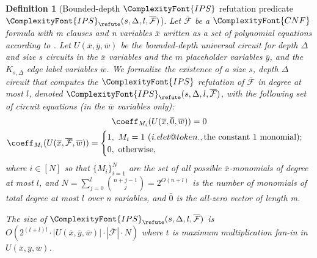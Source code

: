 \documentclass[11pt,letter]{article}
\makeatletter
\newtheorem{definition}[theorem]{Definition}
\theoremstyle{remark} %
\DeclareRobustCommand\onedot{\futurelet\@let@token\@onedot}
\def\@onedot{\ifx\@let@token.\else.\null\fi\xspace}
\def\ie{\emph{i.e}\onedot} \def\Ie{\emph{I.e}\onedot}
\newcommand{\IPS}{%
    {
        \ComplexityFont{IPS} 
    }
}
\newcommand{\CNF}{ %
    {
        \ComplexityFont{CNF}
    }
}
\makeatother
\begin{document}
{    
    \begin{definition}[Bounded-depth $\IPS$ refutation predicate $\IPS_{\refute}(s,\Delta,l,\overline{\mathcal{F}})$]
        \label{def: Constant-depth IPS refutation predicate}
         Let $\overline{\mathcal{F}}$ be a $\CNF$ formula with m clauses and n variables $\overline{x}$ written as a set of polynomial equations according to . Let $U(\overline{x},\overline{y},\overline{w})$ be the bounded-depth universal circuit for depth $\Delta$ and size $s$ circuits in the $\overline{x}$ variables and the $m$ placeholder variables $\overline{y}$, and the $K_{s,\Delta}$ edge label variables $\overline{w}$. We formalize the existence of a size $s$, depth $\Delta$ circuit that computes the $\IPS$ refutation of $\overline{\mathcal{F}}$ in degree at most $l$, denoted $\IPS_{\refute}(s,\Delta,l,\overline{\mathcal{F}})$, with the following set of circuit equations (in the $\overline{w}$ variables only):
            \begin{gather*}
                \coeff_{M_i}(U(\overline{x},\overline{0},\overline{w})) = 0\\
                \coeff_{M_i}(U(\overline{x},\overline{\mathcal{F}},\overline{w}))= 
                    \begin{cases}
                        1,\ M_i =1  \ (\ie, \text{the constant 1 monomial});\\
                        0,\ \text{otherwise},
                    \end{cases}
            \end{gather*}
        where $i \in [N]$ so that $\{M_i\}_{i=1}^N$ are the set of all possible $\overline{x}$-monomials of degree at most $l$, and $N=\sum_{j=0}^l \binom{n+j-1}{j}=2^{O(n+l)}$ is the number of monomials of total degree at most $l$ over n variables, and $\overline{0}$ is the all-zero vector of length m.

        The size of $\IPS_{\refute}(s,\Delta,l,\overline{\mathcal{F}})$ is $O(2^{(t+l)l}\cdot |U(\overline{x},\overline{y},\overline{w})| \cdot |\overline{\mathcal{F}}| \cdot N)$ where $t$ is maximum multiplication fan-in in $U(\overline{x},\overline{y},\overline{w})$.
    \end{definition}
    
}
\end{document}
